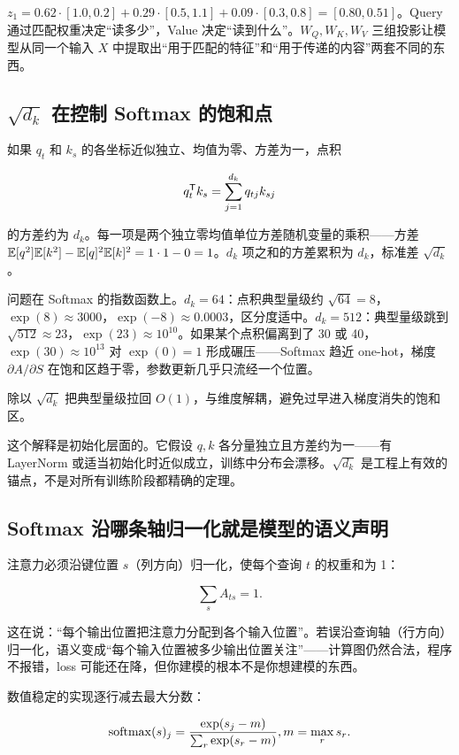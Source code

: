\(z_1 = 0.62\cdot[1.0,0.2] + 0.29\cdot[0.5,1.1] + 0.09\cdot[0.3,0.8] = [0.80, 0.51]\)。Query 通过匹配权重决定``读多少''，Value 决定``读到什么''。\(W_Q,W_K,W_V\) 三组投影让模型从同一个输入 \(X\) 中提取出``用于匹配的特征''和``用于传递的内容''两套不同的东西。

\subsection{\(\sqrt{d_k}\) 在控制 Softmax 的饱和点}

如果 \(q_t\) 和 \(k_s\) 的各坐标近似独立、均值为零、方差为一，点积

\[
q_t^{\mathsf{T}}k_s = \sum_{j=1}^{d_k} q_{tj} k_{sj}
\]

的方差约为 \(d_k\)。每一项是两个独立零均值单位方差随机变量的乘积——方差 \(\mathbb{E}[q^2]\mathbb{E}[k^2] - \mathbb{E}[q]^2\mathbb{E}[k]^2 = 1\cdot 1 - 0 = 1\)。\(d_k\) 项之和的方差累积为 \(d_k\)，标准差 \(\sqrt{d_k}\)。

问题在 Softmax 的指数函数上。\(d_k=64\)：点积典型量级约 \(\sqrt{64}=8\)，\(\exp(8)\approx 3000\)，\(\exp(-8)\approx 0.0003\)，区分度适中。\(d_k=512\)：典型量级跳到 \(\sqrt{512}\approx 23\)，\(\exp(23)\approx 10^{10}\)。如果某个点积偏离到了 30 或 40，\(\exp(30)\approx 10^{13}\) 对 \(\exp(0)=1\) 形成碾压——Softmax 趋近 one-hot，梯度 \(\partial A/\partial S\) 在饱和区趋于零，参数更新几乎只流经一个位置。

除以 \(\sqrt{d_k}\) 把典型量级拉回 \(O(1)\)，与维度解耦，避免过早进入梯度消失的饱和区。

这个解释是初始化层面的。它假设 \(q,k\) 各分量独立且方差约为一——有 LayerNorm 或适当初始化时近似成立，训练中分布会漂移。\(\sqrt{d_k}\) 是工程上有效的锚点，不是对所有训练阶段都精确的定理。

\subsection{Softmax 沿哪条轴归一化就是模型的语义声明}

注意力必须沿键位置 \(s\)（列方向）归一化，使每个查询 \(t\) 的权重和为 1：

\[
\sum_s A_{ts} = 1.
\]

这在说：``每个输出位置把注意力分配到各个输入位置''。若误沿查询轴（行方向）归一化，语义变成``每个输入位置被多少输出位置关注''——计算图仍然合法，程序不报错，loss 可能还在降，但你建模的根本不是你想建模的东西。

数值稳定的实现逐行减去最大分数：

\[
\operatorname{softmax}(s)_j = \frac{\exp(s_j - m)}{\sum_r \exp(s_r - m)},\space m = \max_r s_r.
\]

